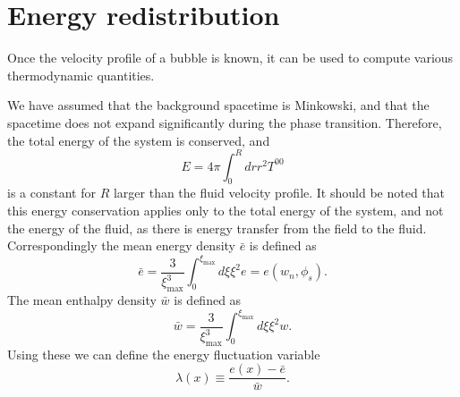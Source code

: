 \section{Energy redistribution}
\label{energy_redistribution}
Once the velocity profile of a bubble is known, it can be used to compute various thermodynamic quantities.

We have assumed that the background spacetime is Minkowski,
and that the spacetime does not expand significantly during the phase transition.
Therefore, the total energy of the system is conserved, and
\begin{equation}
E = 4 \pi \int_0^R dr r^2 T^{00}
\end{equation}
is a constant for $R$ larger than the fluid velocity profile.
It should be noted that this energy conservation applies only to the total energy of the system,
and not the energy of the fluid, as there is energy transfer from the field to the fluid.
\cite[p. 21]{lecture_notes}
Correspondingly the mean energy density $\bar{e}$ is defined as~\cite[p. 39]{lecture_notes}
\begin{equation}
\bar{e} = \frac{3}{\xi_\text{max}^3} \int_0^{\xi_\text{max}} d\xi \xi^2 e = e(w_n, \phi_s).
\label{eq:e_conservation}
\end{equation}
The mean enthalpy density $\bar{w}$ is defined as
\begin{equation}
\bar{w} = \frac{3}{\xi_\text{max}^3} \int_0^{\xi_\text{max}} d\xi \xi^2 w.
\label{eq:wbar}
\end{equation}
Using these we can define the energy fluctuation variable
\begin{equation}
\lambda(x) \equiv \frac{e(x) - \bar{e}}{\bar{w}}.
\label{eq:lambda}
\end{equation}

